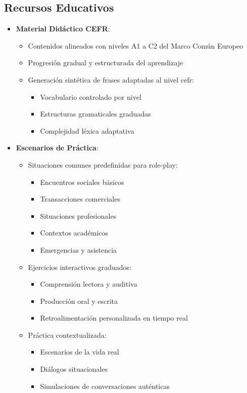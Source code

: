 \subsection{Recursos Educativos}
\begin{itemize}
	\item \textbf{Material Didáctico CEFR}:
	      \begin{itemize}
		      \item Contenidos alineados con niveles A1 a C2 del Marco Común Europeo
		      \item Progresión gradual y estructurada del aprendizaje
		      \item Generación sintética de frases adaptadas al nivel \gls{cefr}:
		            \begin{itemize}
			            \item Vocabulario controlado por nivel
			            \item Estructuras gramaticales graduadas
			            \item Complejidad léxica adaptativa
		            \end{itemize}
	      \end{itemize}

	\item \textbf{Escenarios de Práctica}:
	      \begin{itemize}
		      \item Situaciones comunes predefinidas para role-play:
		            \begin{itemize}
			            \item Encuentros sociales básicos
			            \item Transacciones comerciales
			            \item Situaciones profesionales
			            \item Contextos académicos
			            \item Emergencias y asistencia
		            \end{itemize}
		      \item Ejercicios interactivos graduados:
		            \begin{itemize}
			            \item Comprensión lectora y auditiva
			            \item Producción oral y escrita
			            \item Retroalimentación personalizada en tiempo real
		            \end{itemize}
		      \item Práctica contextualizada:
		            \begin{itemize}
			            \item Escenarios de la vida real
			            \item Diálogos situacionales
			            \item Simulaciones de conversaciones auténticas
		            \end{itemize}
	      \end{itemize}
\end{itemize}
